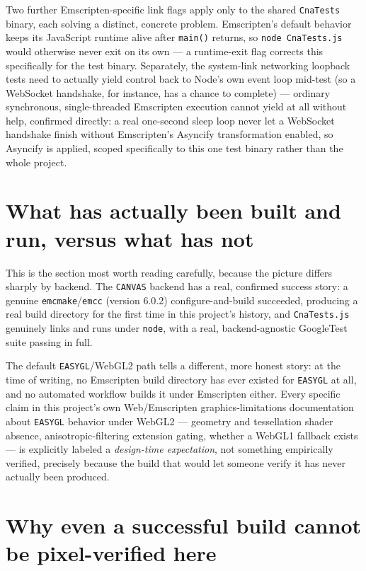 Two further Emscripten-specific link flags apply only to the shared \texttt{CnaTests} binary,
each solving a distinct, concrete problem. Emscripten's default behavior keeps its JavaScript
runtime alive after \texttt{main()} returns, so \texttt{node CnaTests.js} would otherwise never
exit on its own --- a runtime-exit flag corrects this specifically for the test binary.
Separately, the system-link networking loopback tests need to actually yield control back to
Node's own event loop mid-test (so a WebSocket handshake, for instance, has a chance to
complete) --- ordinary synchronous, single-threaded Emscripten execution cannot yield at all
without help, confirmed directly: a real one-second sleep loop never let a WebSocket handshake
finish without Emscripten's Asyncify transformation enabled, so Asyncify is applied, scoped
specifically to this one test binary rather than the whole project.

\section{What has actually been built and run, versus what has not}

This is the section most worth reading carefully, because the picture differs sharply by
backend. The \texttt{CANVAS} backend has a real, confirmed success story: a genuine
\texttt{emcmake}/\texttt{emcc} (version 6.0.2) configure-and-build succeeded, producing a real
build directory for the first time in this project's history, and \texttt{CnaTests.js}
genuinely links and runs under \texttt{node}, with a real, backend-agnostic GoogleTest suite
passing in full.

The default \texttt{EASYGL}/WebGL2 path tells a different, more honest story: at the time of
writing, no Emscripten build directory has ever existed for \texttt{EASYGL} at all, and no
automated workflow builds it under Emscripten either. Every specific claim in this project's
own Web/Emscripten graphics-limitations documentation about \texttt{EASYGL} behavior under
WebGL2 --- geometry and tessellation shader absence, anisotropic-filtering extension gating,
whether a WebGL1 fallback exists --- is explicitly labeled a \emph{design-time expectation},
not something empirically verified, precisely because the build that would let someone verify
it has never actually been produced.

\section{Why even a successful build cannot be pixel-verified here}

